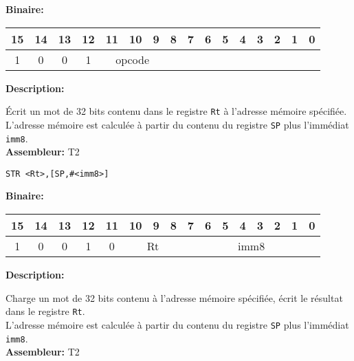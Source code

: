 \documentclass{article}
\begin{document}
    \textbf{Binaire:}\\

    \begin{tabular}{| c c c c c c c c c c c c c c c c |}
        \hline
        15 & 14 & 13 & 12 & \multicolumn{1}{|c}{11} & 10 & 9 & \multicolumn{1}{|c}{8} & 7 & 6 & 5 & 4 & 3 & 2 & 1 & 0 \\
        \hline
        1 & 0 & 0 & 1 & \multicolumn{3}{|c}{opcode} & \multicolumn{9}{|c|}{} \\
        \hline
    \end{tabular}


    \textbf{Description: }

    Écrit un mot de 32 bits contenu dans le registre \texttt{Rt} à l'adresse mémoire spécifiée.\\
    L'adresse mémoire est calculée à partir du contenu du registre \texttt{SP} plus l'immédiat \texttt{imm8}.\\

    \textbf{Assembleur:} T2

    \begin{lstlisting}
STR <Rt>,[SP,#<imm8>]
    \end{lstlisting}

    \textbf{Binaire:}\\

    \begin{tabular}{| c c c c c c c c c c c c c c c c |}
        \hline
        15 & 14 & 13 & 12 & \multicolumn{1}{|c}{11} & \multicolumn{1}{|c}{10} & 9 & 8 & \multicolumn{1}{|c}{7} & 6 & 5 & 4 & 3 & 2 & 1 & 0 \\
        \hline
        1 & 0 & 0 & 1 & \multicolumn{1}{|c}{0} & \multicolumn{3}{|c}{Rt} & \multicolumn{8}{|c|}{imm8} \\
        \hline
    \end{tabular}



    \textbf{Description: }

    Charge un mot de 32 bits contenu à l'adresse mémoire spécifiée, écrit le résultat dans le registre \texttt{Rt}.\\
    L'adresse mémoire est calculée à partir du contenu du registre \texttt{SP} plus l'immédiat \texttt{imm8}.\\

    \textbf{Assembleur:} T2
\end{document}
